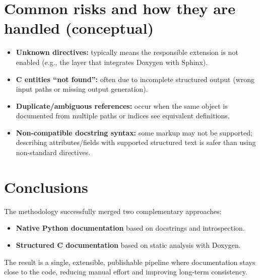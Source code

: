 \documentclass[11pt,a4paper]{article}
\begin{document}
\section{Common risks and how they are handled (conceptual)}
\begin{itemize}[leftmargin=*,itemsep=2pt]
  \item \textbf{Unknown directives:} typically means the responsible extension is not enabled (e.g., the layer that integrates Doxygen with Sphinx).
  \item \textbf{C entities ``not found'':} often due to incomplete structured output (wrong input paths or missing output generation).
  \item \textbf{Duplicate/ambiguous references:} occur when the same object is documented from multiple paths or indices see equivalent definitions.
  \item \textbf{Non-compatible docstring syntax:} some markup may not be supported; describing attributes/fields with supported structured text is safer than using non-standard directives.
\end{itemize}

\section{Conclusions}
The methodology successfully merged two complementary approaches:
\begin{itemize}[leftmargin=*,itemsep=2pt]
  \item \textbf{Native Python documentation} based on docstrings and introspection.
  \item \textbf{Structured C documentation} based on static analysis with Doxygen.
\end{itemize}
The result is a single, extensible, publishable pipeline where documentation stays close to the code, reducing manual effort and improving long-term consistency.
\end{document}
